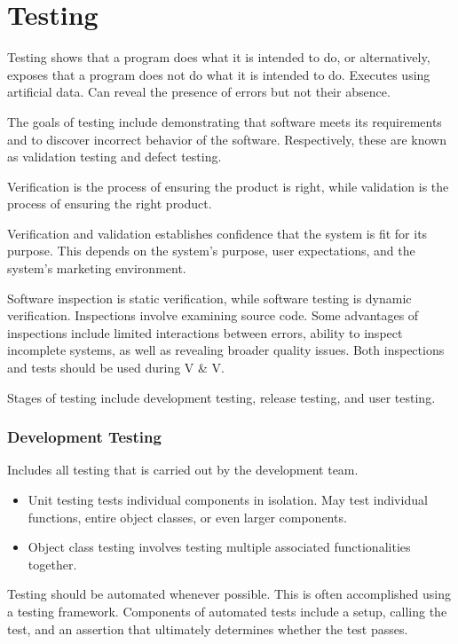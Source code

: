 \documentclass[12pt]{article}
\begin{document}
\section*{Testing}

Testing shows that a program does what it is intended to do, or alternatively,
exposes that a program does not do what it is intended to do. Executes using
artificial data. Can reveal the presence of errors but not their absence.

The goals of testing include demonstrating that software meets its requirements
and to discover incorrect behavior of the software. Respectively, these are
known as validation testing and defect testing.

Verification is the process of ensuring the product is right, while validation
is the process of ensuring the right product.

Verification and validation establishes confidence that the system is fit for
its purpose. This depends on the system's purpose, user expectations, and
the system's marketing environment.

Software inspection is static verification, while software testing is dynamic
verification. Inspections involve examining source code. Some advantages of
inspections include limited interactions between errors, ability to inspect
incomplete systems, as well as revealing broader quality issues. Both
inspections and tests should be used during V \& V.

Stages of testing include development testing, release testing, and user
testing.

\subsubsection*{Development Testing}

Includes all testing that is carried out by the development team.

\begin{itemize}
    \item Unit testing tests individual components in isolation. May test
    individual functions, entire object classes, or even larger components.

    \item Object class testing involves testing multiple associated
    functionalities together.
\end{itemize}

Testing should be automated whenever possible. This is often accomplished
using a testing framework. Components of automated tests include a setup,
calling the test, and an assertion that ultimately determines whether the
test passes.
\end{document}
